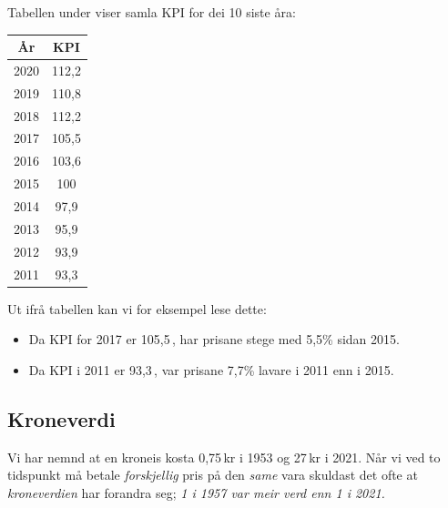 Tabellen under viser samla KPI for dei 10 siste åra:
\begin{center}
	\begin{tabular}{c|c}
		År &  KPI \\ \hline
		2020 & 112,2\\
		2019 & 	110,8\\
		2018 &  112,2 \\
		2017&	105,5\\
		2016&	103,6\\
		2015&	100\\
		2014&	97,9\\
		2013&	95,9\\
		2012&	93,9\\
		2011&	93,3\\
	\end{tabular}
\end{center}
Ut ifrå tabellen kan vi for eksempel lese dette:
\begin{itemize}
	\item Da KPI for 2017 er 105,5\,, har prisane stege med 5,5\% sidan 2015.
	\item Da KPI i 2011 er 93,3\,, var prisane 7,7\% lavare i 2011 enn i 2015.
\end{itemize}
\newpage
{}
\subsection{Kroneverdi}
Vi har nemnd at en kroneis kosta 0,75\,kr i 1953 og 27\,kr i 2021. Når vi ved to tidspunkt må betale \textsl{forskjellig} pris på den \textsl{same} vara skuldast det ofte at \textit{kroneverdien} har forandra seg;\textsl{ 1 i 1957 var meir verd enn 1 i 2021.
}\vsk

